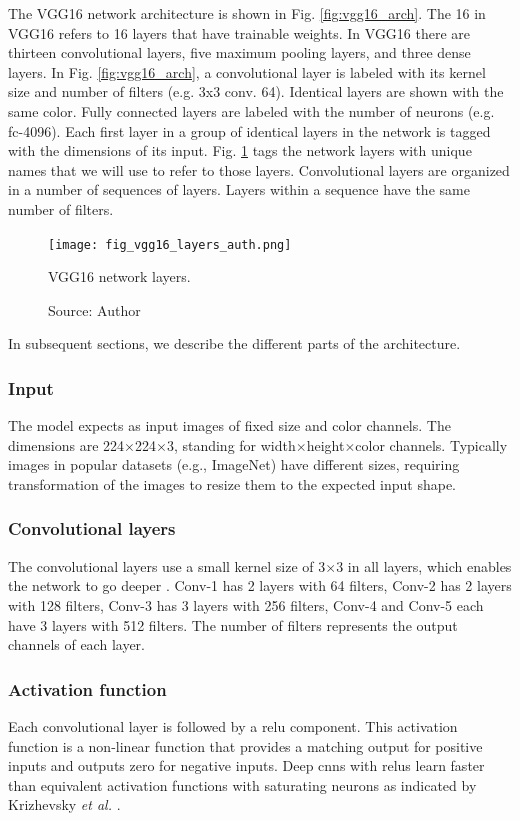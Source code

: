 The VGG16 network architecture is shown in Fig. \ref{fig:vgg16_arch}. The 16 in VGG16 refers to 16 layers that have trainable weights. In VGG16 there are thirteen convolutional layers, five maximum pooling layers, and three dense layers. In Fig. \ref{fig:vgg16_arch}, a convolutional layer is labeled with its kernel size and number of filters  (e.g. 3x3 conv. 64). Identical layers are shown with the same color. Fully connected layers are labeled with the number of neurons (e.g. fc-4096). Each first layer in a group of identical layers in the network is tagged with the dimensions of its input. Fig. \ref{fig:vgg16_layers_auth} tags the network layers with unique names that we will use to refer to those layers. Convolutional layers are organized in a number of sequences of layers. Layers within a sequence have the same number of filters.
\begin{figure}[ht]
    \begin{center}       
    \texttt{[image: fig\_vgg16\_layers\_auth.png]}
    \caption[VGG16 network layers]{VGG16 network layers.}
    \caption*{Source: Author}
    \label{fig:vgg16_layers_auth}
    \end{center}
\end{figure}

In subsequent sections, we describe the different parts of the architecture.
\subsubsection{Input}
The model expects as input images of fixed size and color channels. The dimensions are 224$\times$224$\times$3, standing for width$\times$height$\times$color channels. Typically images in popular datasets (e.g., ImageNet) have different sizes, requiring transformation of the images to resize them to the expected input shape.

\subsubsection{Convolutional layers}
The convolutional layers use a small kernel size of 3$\times$3 in all layers, which enables the network to go deeper \cite{simonyan2014very}. Conv-1 has 2 layers with 64 filters, Conv-2 has 2 layers with 128 filters, Conv-3 has 3 layers with 256 filters, Conv-4 and Conv-5 each have 3 layers with 512 filters. The number of filters represents the output channels of each layer.

\subsubsection{Activation function}
Each convolutional layer is followed by a \acrfull{relu} component. This activation function is a non-linear function that provides a matching output for positive inputs and outputs zero for negative inputs. Deep \acrshort{cnn}s with \acrshort{relu}s learn faster than equivalent activation functions with saturating neurons as indicated by Krizhevsky \textit{et al.} \cite{krizhevsky2017imagenet}.


